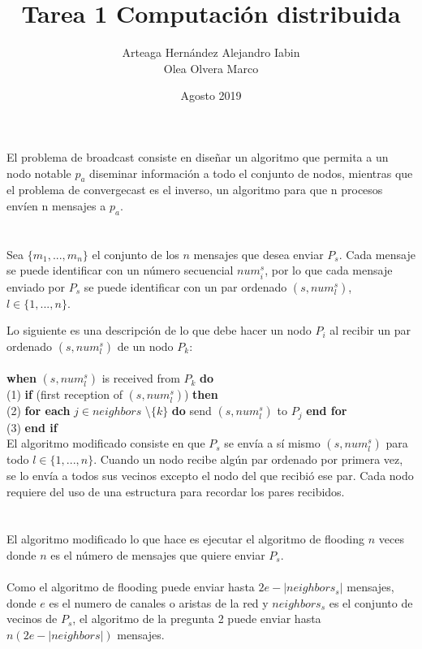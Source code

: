 \documentclass{article}
\title{Tarea 1 Computación distribuida}
\author{Arteaga Hernández Alejandro Iabin \\
Olea Olvera Marco}
\date{Agosto 2019}
\begin{document}
\maketitle

\section{}
El problema de broadcast consiste en diseñar un algoritmo que permita a un nodo notable $p_a$ diseminar información a todo el conjunto de nodos, mientras que el problema de convergecast es el inverso, un algoritmo para que n procesos envíen n mensajes a $p_a$.


\section{}
Sea $\{m_1, ..., m_n\}$ el conjunto de los $n$ mensajes que desea enviar $P_s$. Cada mensaje se puede identificar con un número secuencial $num^s_i$, por lo que cada mensaje enviado por $P_s$ se puede identificar con un par ordenado $(s, num^s_l)$, $l \in \{1, ..., n\}$.

Lo siguiente es una descripción de lo que debe hacer un nodo $P_i$ al recibir un par ordenado $(s, num^s_l)$ de un nodo $P_k$: \\ \\
\textbf{when} $(s, num^s_l)$ is received from \textit{$P_k$} \textbf{do} \\
(1) \textbf{if} (first reception of $(s, num^s_l)$) \textbf{then} \\
(2) \textbf{for each} $j \in neighbors$ \textbackslash $\{k\}$ \textbf{do} send $(s, num^s_l)$ to $P_j$ \textbf{end for} \\
(3) \textbf{end if} \\

El algoritmo modificado consiste en que $P_s$ se envía a sí mismo $(s, num^s_l)$ para todo $l \in \{1, ..., n\}$. Cuando un nodo recibe algún par ordenado por primera vez, se lo envía a todos sus vecinos excepto el nodo del que recibió ese par. Cada nodo requiere del uso de una estructura para recordar los pares recibidos.

\section{}
El algoritmo modificado lo que hace es ejecutar el algoritmo de flooding $n$ veces donde $n$ es el número de mensajes que quiere enviar $P_s$.
\\\\
Como el algoritmo de flooding  puede enviar hasta $2e-|neighbors_s|$ mensajes, donde  $e$ es el numero de canales o aristas de la red y $neighbors_s$ es el conjunto de vecinos de $P_s$, el algoritmo de la pregunta 2 puede enviar hasta\\ $n(2e-|neighbors|)$ mensajes.
\end{document}
